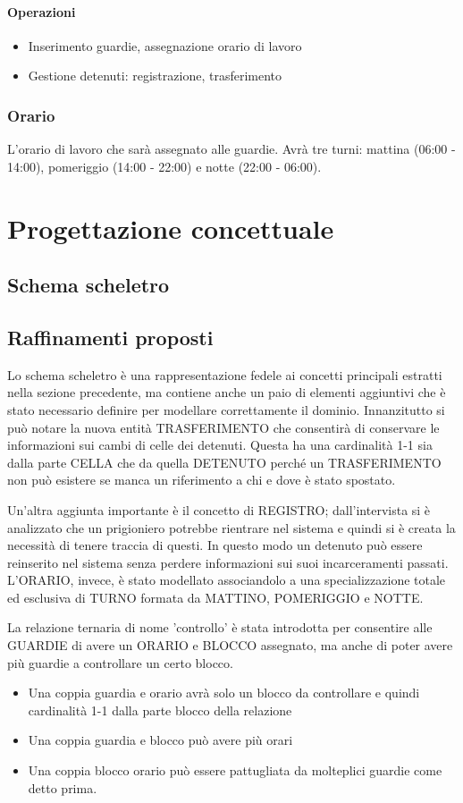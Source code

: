 \documentclass[a4paper,12pt]{report}
\begin{document}
\subsubsection*{Operazioni}
\begin{itemize}
    \item Inserimento guardie, assegnazione orario di lavoro
    \item Gestione detenuti: registrazione, trasferimento
\end{itemize}
\subsection*{Orario}
L'orario di lavoro che sarà assegnato alle guardie.
%
Avrà tre turni: mattina (06:00 - 14:00), pomeriggio (14:00 - 22:00) e notte (22:00 - 06:00).
\chapter{Progettazione concettuale}
\section{Schema scheletro}
\section{Raffinamenti proposti}
Lo schema scheletro è una rappresentazione fedele ai concetti principali estratti nella sezione precedente, ma contiene anche un paio di elementi aggiuntivi che è stato necessario definire per modellare correttamente il dominio.
%
Innanzitutto si può notare la nuova entità TRASFERIMENTO che consentirà di conservare le informazioni sui cambi di celle dei detenuti.
%
Questa ha una cardinalità 1-1 sia dalla parte CELLA che da quella DETENUTO perché un TRASFERIMENTO non può esistere se manca un riferimento a chi e dove è stato spostato.
%
\par
Un'altra aggiunta importante è il concetto di REGISTRO; dall'intervista si è analizzato che un prigioniero potrebbe rientrare nel sistema e quindi si è creata la necessità di tenere traccia di questi.
%
In questo modo un detenuto può essere reinserito nel sistema senza perdere informazioni sui suoi incarceramenti passati.
%
L'ORARIO, invece, è stato modellato associandolo a una specializzazione totale ed esclusiva di TURNO formata da MATTINO, POMERIGGIO e NOTTE.
%
\par La relazione ternaria di nome 'controllo' è stata introdotta per consentire alle GUARDIE di avere un ORARIO e BLOCCO assegnato, ma anche di poter avere più guardie a controllare un certo blocco.
%
\begin{itemize}
    \item Una coppia guardia e orario avrà solo un blocco da controllare e quindi cardinalità 1-1 dalla parte blocco della relazione
    \item Una coppia guardia e blocco può avere più orari
    \item Una coppia blocco orario può essere pattugliata da molteplici guardie come detto prima.
\end{itemize}
\end{document}
